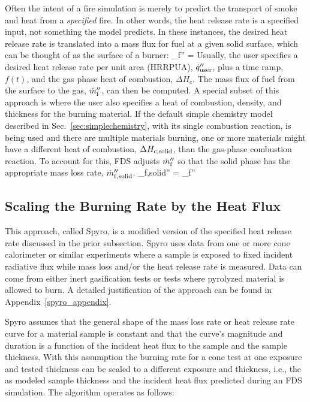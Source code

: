 Often the intent of a fire simulation is merely to predict the transport of smoke and heat from a {\em specified} fire. In other words, the heat release rate is a specified input, not something the model predicts. In these instances, the desired heat release rate is translated into a mass flux for fuel at a given solid surface, which can be thought of as the surface of a burner:
\be
   \dm_{\rm f}'' = 
\ee
Usually, the user specifies a desired heat release rate per unit area (HRRPUA), $\dot{q}_{\rm user}''$, plus a time ramp, $f(t)$, and the gas phase heat of combustion, $\Delta H_{\unit{c}}$. The mass flux of fuel from the surface to the gas, $\dot{m}_{\rm f}''$, can then be computed. A special subset of this approach is where the user also specifies a heat of combustion, density, and thickness for the burning material. If the default simple chemistry model described in Sec.~\ref{sec:simplechemistry}, with its single combustion reaction, is being used and there are multiple materials burning, one or more materials might have a different heat of combustion, $\Delta H_{\unit{c}{\rm ,solid}}$, than the gas-phase combustion reaction. To account for this, FDS adjusts $\dot{m}_{\rm f}''$ so that the solid phase has the appropriate mass loss rate, $\dot{m}_{\rm f,solid}''$.
\be
\dm_{\rm f,solid}'' = \dm_{\rm f}'' 
\ee

\subsection{Scaling the Burning Rate by the Heat Flux}
\label{spyro_algorithm}

This approach, called Spyro, is a modified version of the specified heat release rate discussed in the prior subsection. Spyro uses data from one or more cone calorimeter or similar experiments where a sample is exposed to fixed incident radiative flux while mass loss and/or the heat release rate is measured. Data can come from either inert gasification tests or tests where pyrolyzed material is allowed to burn. A detailed justification of the approach can be found in Appendix~\ref{spyro_appendix}.


Spyro assumes that the general shape of the mass loss rate or heat release rate curve for a material sample is constant and that the curve's magnitude and duration is a function of the incident heat flux to the sample and the sample thickness. With this assumption the burning rate for a cone test at one exposure and tested thickness can be scaled to a different exposure and thickness, i.e., the as modeled sample thickness and the incident heat flux predicted during an FDS simulation. The algorithm operates as follows:

